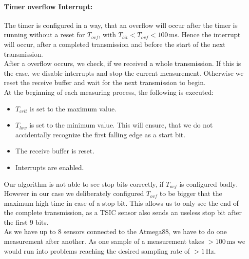\documentclass[a4paper]{scrreprt}
\begin{document}
\paragraph{Timer overflow Interrupt:} The timer is configured in a way, that an overflow will occur after
the timer is running without a reset for $T_{ovf}$, with $T_{bit} < T_{ovf} < 100\,\mathrm{ms}$. Hence
the interrupt will occur, after a completed transmission and before the start of the next transmission.\\
After a overflow occurs, we check, if we received a whole transmission. If this is the case, we disable
interrupts and stop the current measurement. Otherwise we reset the receive buffer and wait for the
next transmission to begin.
\\[0.6cm]
At the beginning of each measuring process, the following is executed:
\begin{itemize}
	\item $T_{crit}$ is set to the maximum value.
	\item $T_{low}$ is set to the minimum value. This will ensure, that we do not
		accidentally recognize the first falling edge as a start bit.
	\item The receive buffer is reset.
	\item Interrupts are enabled.
\end{itemize}
Our algorithm is not able to see stop bits correctly, if $T_{ovf}$ is configured badly.
However in our case we deliberately configured $T_{ovf}$ to be bigger that the maximum
high time in case of a stop bit.
This allows us to only see the end of the complete transmission, as a TSIC sensor also
sends an useless stop bit after the first 9 bits.\\
As we have up to 8 sensors connected to the Atmega88, we have to do one measurement after another.
As one sample of a measurement takes $>100\,\mathrm{ms}$ we would run
into problems reaching the desired sampling rate of $>1\,\mathrm{Hz}$.
\end{document}
